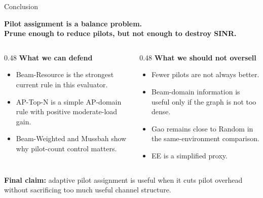 \documentclass[10pt,aspectratio=169]{beamer}
\newenvironment{tightitemize}{%
    \begin{itemize}
        \setlength{\itemsep}{1pt}
        \setlength{\parskip}{0pt}
        \setlength{\parsep}{0pt}
}{%
    \end{itemize}
}
\begin{document}
\begin{frame}{Conclusion}
    \small
    \begin{center}
        \normalsize
        \textbf{Pilot assignment is a balance problem.}\\
        \vspace{0.10em}
        \textbf{Prune enough to reduce pilots, but not enough to destroy SINR.}
    \end{center}

    \vspace{0.25em}
    \begin{columns}[T,onlytextwidth]
        \begin{column}{0.48\textwidth}
            \scriptsize
            \textbf{What we can defend}
            \begin{tightitemize}
                \item Beam-Resource is the strongest current rule in this evaluator.
                \item AP-Top-N is a simple AP-domain rule with positive moderate-load gain.
                \item Beam-Weighted and Mussbah show why pilot-count control matters.
            \end{tightitemize}
        \end{column}
        \begin{column}{0.48\textwidth}
            \scriptsize
            \textbf{What we should not oversell}
            \begin{tightitemize}
                \item Fewer pilots are not always better.
                \item Beam-domain information is useful only if the graph is not too dense.
                \item Gao remains close to Random in the same-environment comparison.
                \item EE is a simplified proxy.
            \end{tightitemize}
        \end{column}
    \end{columns}

    \vspace{0.35em}
    \begin{center}
        \footnotesize
        \textbf{Final claim:} adaptive pilot assignment is useful when it cuts pilot overhead without sacrificing too much useful channel structure.
    \end{center}
\end{frame}
\end{document}
